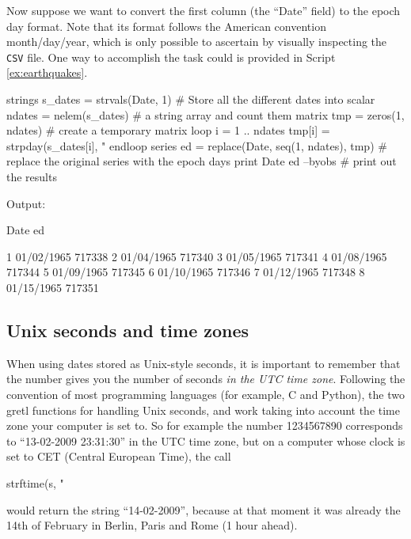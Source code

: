 Now suppose we want to convert the first column (the ``Date'' field)
to the epoch day format. Note that its format follows the American
convention month/day/year, which is only possible to ascertain by
visually inspecting the \texttt{CSV} file. One way to accomplish the
task could is provided in Script \ref{ex:earthquakes}.

\begin{script}[htbp]
  \label{ex:earthquakes}
\begin{scodebit}
strings s_dates = strvals(Date, 1)             # Store all the different dates into 
scalar ndates = nelem(s_dates)                 # a string array and count them
matrix tmp = zeros(1, ndates)                  # create a temporary matrix
loop i = 1 .. ndates
    tmp[i] = strpday(s_dates[i], "%
endloop
series ed = replace(Date, seq(1, ndates), tmp) # replace the original series with the epoch days
print Date ed --byobs                          # print out the results

\end{scodebit}
  
Output:
\begin{outbit}
                      Date           ed

1               01/02/1965       717338
2               01/04/1965       717340
3               01/05/1965       717341
4               01/08/1965       717344
5               01/09/1965       717345
6               01/10/1965       717346
7               01/12/1965       717348
8               01/15/1965       717351
\end{outbit}
\end{script}

\subsection{Unix seconds and time zones}

When using dates stored as Unix-style seconds, it is important to
remember that the number gives you the number of seconds \emph{in the
  UTC time zone}. Following the convention of most programming
languages (for example, C and Python), the two gretl functions for
handling Unix seconds,  and  work taking
into account the time zone your computer is set to. So for example the
number 1234567890 corresponds to ``13-02-2009 23:31:30'' in the UTC
time zone, but on a computer whose clock is set to CET (Central
European Time), the call
\begin{code}
  strftime(s, "%
\end{code}
would return the string ``14-02-2009'', because at that moment it was
already the 14th of February in Berlin, Paris and Rome (1 hour ahead).

